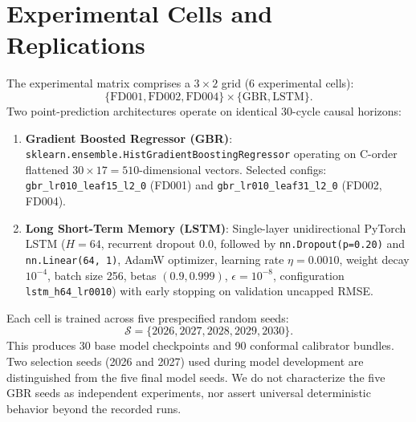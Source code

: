 \section{Experimental Cells and Replications}
The experimental matrix comprises a $3 \times 2$ grid (6 experimental cells):
\begin{equation}
\{\text{FD001}, \text{FD002}, \text{FD004}\} \times \{\text{GBR}, \text{LSTM}\}.
\end{equation}
Two point-prediction architectures operate on identical 30-cycle causal horizons:
\begin{enumerate}
    \item \textbf{Gradient Boosted Regressor (GBR)}: \texttt{sklearn.ensemble.HistGradientBoostingRegressor} operating on C-order flattened $30 \times 17 = 510$-dimensional vectors. Selected configs: \texttt{gbr\_lr010\_leaf15\_l2\_0} (FD001) and \texttt{gbr\_lr010\_leaf31\_l2\_0} (FD002, FD004).
    \item \textbf{Long Short-Term Memory (LSTM)}: Single-layer unidirectional PyTorch LSTM ($H=64$, recurrent dropout $0.0$, followed by \texttt{nn.Dropout(p=0.20)} and \texttt{nn.Linear(64, 1)}, AdamW optimizer, learning rate $\eta=0.0010$, weight decay $10^{-4}$, batch size 256, betas $(0.9, 0.999)$, $\epsilon=10^{-8}$, configuration \texttt{lstm\_h64\_lr0010}) with early stopping on validation uncapped RMSE.
\end{enumerate}
Each cell is trained across five prespecified random seeds:
\begin{equation}
\mathcal{S} = \{2026, 2027, 2028, 2029, 2030\}.
\end{equation}
This produces 30 base model checkpoints and 90 conformal calibrator bundles. Two selection seeds (2026 and 2027) used during model development are distinguished from the five final model seeds. We do not characterize the five GBR seeds as independent experiments, nor assert universal deterministic behavior beyond the recorded runs.

